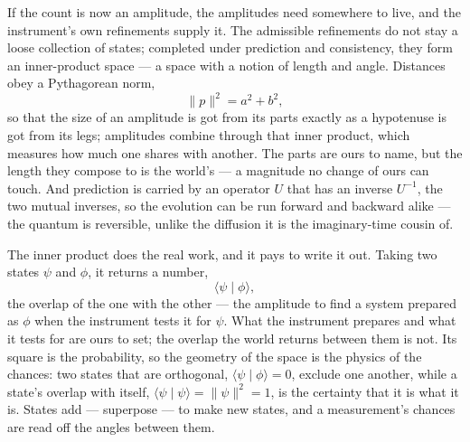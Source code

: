 If the count is now an amplitude, the amplitudes need somewhere to live, and the instrument's own refinements
supply it. The admissible refinements do not stay a loose collection of states; completed under prediction
and consistency, they form an inner-product space --- a space with a notion of length and angle. Distances
obey a Pythagorean norm,
\begin{equation}
  \lVert p\rVert^2 = a^2 + b^2,
\end{equation}
so that the size of an amplitude is got from its parts exactly as a hypotenuse is got from its legs;
amplitudes combine through that inner product, which measures how much one shares with another. The parts are
ours to name, but the length they compose to is the world's --- a magnitude no change of ours can touch. And
prediction is carried by an operator $U$ that has an inverse $U^{-1}$, the two mutual inverses, so the evolution
can be run forward and backward alike --- the quantum is reversible, unlike the diffusion it is the
imaginary-time cousin of.

The inner product does the real work, and it pays to write it out. Taking two states $\psi$ and $\phi$, it
returns a number,
\begin{equation}
  \langle \psi \mid \phi \rangle,
\end{equation}
the overlap of the one with the other --- the amplitude to find a system prepared as $\phi$ when the
instrument tests it for $\psi$. What the instrument prepares and what it tests for are ours to set; the overlap
the world returns between them is not. Its square is the probability, so the geometry of the space is the
physics of the chances: two states that are orthogonal, $\langle \psi \mid \phi \rangle = 0$, exclude one another, while
a state's overlap with itself, $\langle \psi \mid \psi \rangle = \lVert \psi \rVert^2 = 1$, is the certainty
that it is what it is. States add --- superpose --- to make new states, and a measurement's chances are read
off the angles between them.

